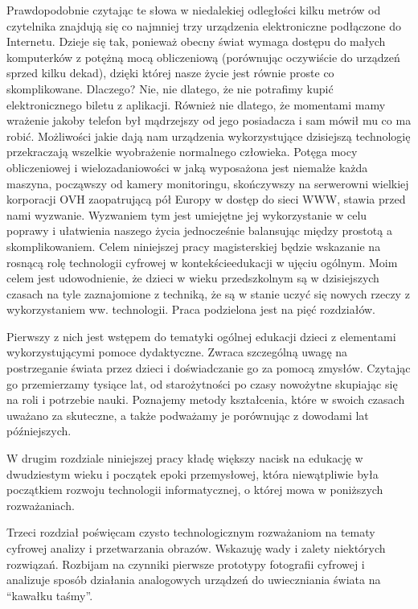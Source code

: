 \documentclass{article}
\begin{document}
	\par
	Prawdopodobnie czytając te słowa w niedalekiej odległości kilku metrów od czytelnika znajdują się co najmniej trzy urządzenia elektroniczne podłączone do Internetu. Dzieje się tak, ponieważ obecny świat wymaga dostępu do małych komputerków z potężną mocą obliczeniową (porównując oczywiście do urządzeń sprzed kilku dekad), dzięki której nasze życie jest równie proste co skomplikowane. Dlaczego? Nie, nie dlatego, że nie potrafimy kupić elektronicznego biletu z aplikacji. Również nie dlatego, że momentami mamy wrażenie jakoby telefon był mądrzejszy od jego posiadacza i sam mówił mu co ma robić. Możliwości jakie dają nam urządzenia wykorzystujące dzisiejszą technologię przekraczają wszelkie wyobrażenie normalnego człowieka. Potęga mocy obliczeniowej i wielozadaniowości w jaką wyposażona jest niemalże każda maszyna, począwszy od kamery monitoringu, skończywszy na serwerowni wielkiej korporacji OVH zaopatrującą pół Europy w dostęp do sieci WWW, stawia przed nami wyzwanie. Wyzwaniem tym jest umiejętne jej wykorzystanie w celu poprawy i ułatwienia naszego życia jednocześnie balansując między prostotą a skomplikowaniem.
	Celem niniejszej pracy magisterskiej będzie wskazanie na rosnącą rolę technologii cyfrowej w kontekście\linebreak edukacji w ujęciu ogólnym. Moim celem jest udowodnienie, że dzieci w wieku przedszkolnym są w dzisiejszych czasach na tyle zaznajomione z techniką, że są w stanie uczyć się nowych rzeczy z wykorzystaniem ww. technologii. Praca podzielona jest na pięć rozdziałów.
	\par 
	Pierwszy z nich jest wstępem do tematyki ogólnej edukacji dzieci z elementami wykorzystującymi pomoce dydaktyczne. Zwraca szczególną uwagę na postrzeganie świata przez dzieci i doświadczanie go za pomocą zmysłów. Czytając go przemierzamy tysiące lat, od starożytności po czasy nowożytne skupiając się na roli i potrzebie nauki. Poznajemy metody kształcenia, które w swoich czasach uważano za skuteczne, a także podważamy je porównując z dowodami lat późniejszych.
	\par
	W drugim rozdziale niniejszej pracy kładę większy nacisk na edukację w dwudziestym wieku i początek epoki przemysłowej, która niewątpliwie była początkiem rozwoju technologii informatycznej, o której mowa w poniższych rozważaniach.
	\par
	Trzeci rozdział poświęcam czysto technologicznym rozważaniom na tematy cyfrowej analizy i przetwarzania obrazów. Wskazuję wady i zalety niektórych rozwiązań. Rozbijam na czynniki pierwsze prototypy fotografii cyfrowej i analizuje sposób działania analogowych urządzeń do uwieczniania świata na “kawałku taśmy”.
\end{document}

